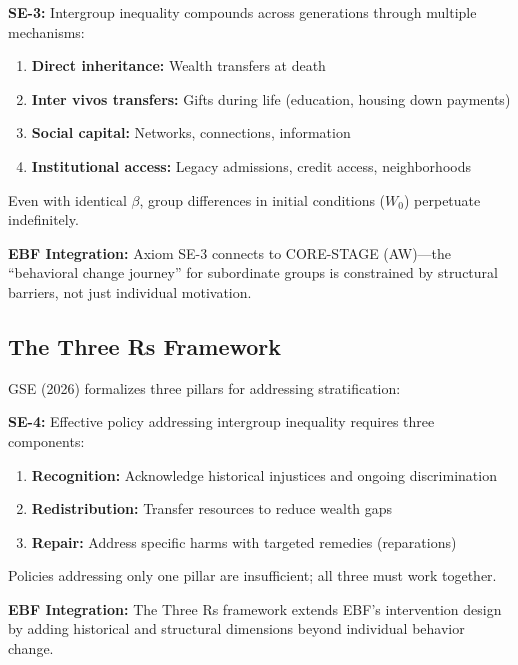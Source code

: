 \begin{axiom}
\label{ax:se-3}
\textbf{SE-3:} Intergroup inequality compounds across generations through multiple mechanisms:
\begin{enumerate}
    \item \textbf{Direct inheritance:} Wealth transfers at death
    \item \textbf{Inter vivos transfers:} Gifts during life (education, housing down payments)
    \item \textbf{Social capital:} Networks, connections, information
    \item \textbf{Institutional access:} Legacy admissions, credit access, neighborhoods
\end{enumerate}
Even with identical $\beta$, group differences in initial conditions ($W_0$) perpetuate indefinitely.
\end{axiom}

\textbf{EBF Integration:} Axiom SE-3 connects to CORE-STAGE (AW)---the ``behavioral change journey'' for subordinate groups is constrained by structural barriers, not just individual motivation.

\subsection{The Three Rs Framework}
\label{subsec:se-three-rs}

GSE (2026) formalizes three pillars for addressing stratification:

\begin{axiom}
\label{ax:se-4}
\textbf{SE-4:} Effective policy addressing intergroup inequality requires three components:
\begin{enumerate}
    \item \textbf{Recognition:} Acknowledge historical injustices and ongoing discrimination
    \item \textbf{Redistribution:} Transfer resources to reduce wealth gaps
    \item \textbf{Repair:} Address specific harms with targeted remedies (reparations)
\end{enumerate}
Policies addressing only one pillar are insufficient; all three must work together.
\end{axiom}

\textbf{EBF Integration:} The Three Rs framework extends EBF's intervention design by adding historical and structural dimensions beyond individual behavior change.

